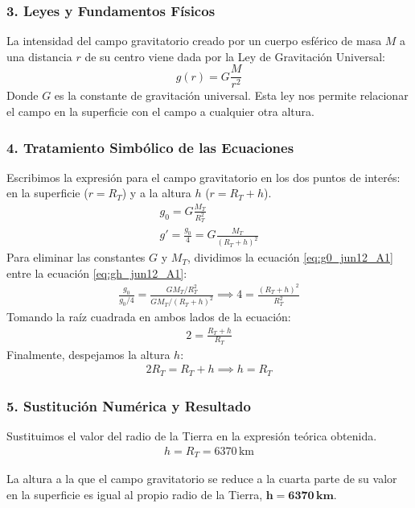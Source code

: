 \subsubsection*{3. Leyes y Fundamentos Físicos}
La intensidad del campo gravitatorio creado por un cuerpo esférico de masa $M$ a una distancia $r$ de su centro viene dada por la Ley de Gravitación Universal:
$$g(r) = G\frac{M}{r^2}$$
Donde $G$ es la constante de gravitación universal. Esta ley nos permite relacionar el campo en la superficie con el campo a cualquier otra altura.

\subsubsection*{4. Tratamiento Simbólico de las Ecuaciones}
Escribimos la expresión para el campo gravitatorio en los dos puntos de interés: en la superficie ($r=R_T$) y a la altura $h$ ($r=R_T+h$).
\begin{gather}
    g_0 = G\frac{M_T}{R_T^2} \label{eq:g0_jun12_A1} \\
    g' = \frac{g_0}{4} = G\frac{M_T}{(R_T+h)^2} \label{eq:gh_jun12_A1}
\end{gather}
Para eliminar las constantes $G$ y $M_T$, dividimos la ecuación \eqref{eq:g0_jun12_A1} entre la ecuación \eqref{eq:gh_jun12_A1}:
\begin{gather}
    \frac{g_0}{g_0/4} = \frac{G M_T / R_T^2}{G M_T / (R_T+h)^2} \implies 4 = \frac{(R_T+h)^2}{R_T^2}
\end{gather}
Tomando la raíz cuadrada en ambos lados de la ecuación:
\begin{gather}
    2 = \frac{R_T+h}{R_T}
\end{gather}
Finalmente, despejamos la altura $h$:
\begin{gather}
    2R_T = R_T + h \implies h = R_T
\end{gather}

\subsubsection*{5. Sustitución Numérica y Resultado}
Sustituimos el valor del radio de la Tierra en la expresión teórica obtenida.
\begin{gather}
    h = R_T = 6370\,\text{km}
\end{gather}
\begin{cajaresultado}
La altura a la que el campo gravitatorio se reduce a la cuarta parte de su valor en la superficie es igual al propio radio de la Tierra, $\boldsymbol{h = 6370\,\textbf{km}}$.
\end{cajaresultado}

